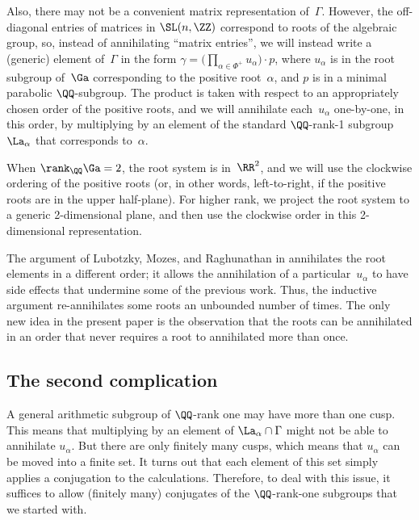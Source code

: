 Also, there may not be a convenient matrix representation of~$\Gamma$. However, the off-diagonal entries of matrices in $\SL(n,\ZZ)$ correspond to roots of the algebraic group, so, instead of annihi\-la\-ting ``matrix entries'', we will instead write a (generic) element of~$\Gamma$ in the form $\gamma = \bigl(\prod\limits_{\alpha\in \Phi^+} u_\alpha \bigr) \cdot p$, where $u_\alpha$ is in the root subgroup of~$\Ga$ corresponding to the positive root~$\alpha$, and $p$ is in a minimal parabolic $\QQ$-subgroup.
The product is taken with respect to an appropriately chosen order of the positive roots, and we will annihilate each~$u_\alpha$ one-by-one, in this order, by multiplying by an element of the standard $\QQ$-rank-1 subgroup~$\La_\alpha$ that corresponds to~$\alpha$.

When $\rank_\QQ \Ga = 2$, the root system is in~$\RR^2$, and we will use the clockwise ordering of the positive roots (or, in other words, left-to-right, if the positive roots are in the upper half-plane). For higher rank, we project the root system to a generic 2-dimensional plane, and then use the clockwise order in this 2-dimensional representation.

\begin{rem} The argument of Lubotzky, Mozes, and Raghunathan in \cite[Section~4]{MR1828742} annihilates the root elements in a different order; it allows the annihilation of a particular~$u_\alpha$ to have side effects that undermine some of the previous work. Thus, the inductive argument re-annihilates some roots an unbounded number of times. The only new idea in the present paper is the observation that the roots can be annihilated in an order that never requires a root to annihilated more than once.
\end{rem}

\subsection*{The second complication}
 A general arithmetic subgroup of $\QQ$-rank one may have more than one cusp. This means that multiplying by an element of $\La_\alpha \cap \Gamma$ might not be able to annihilate $u_\alpha$. But there are only finitely many cusps, which means that $u_\alpha$ can be moved into a finite set. It turns out that each element of this set simply applies a conjugation to the calculations. Therefore, to deal with this issue, it suffices to allow (finitely many) conjugates of the $\QQ$-rank-one subgroups that we started with.

